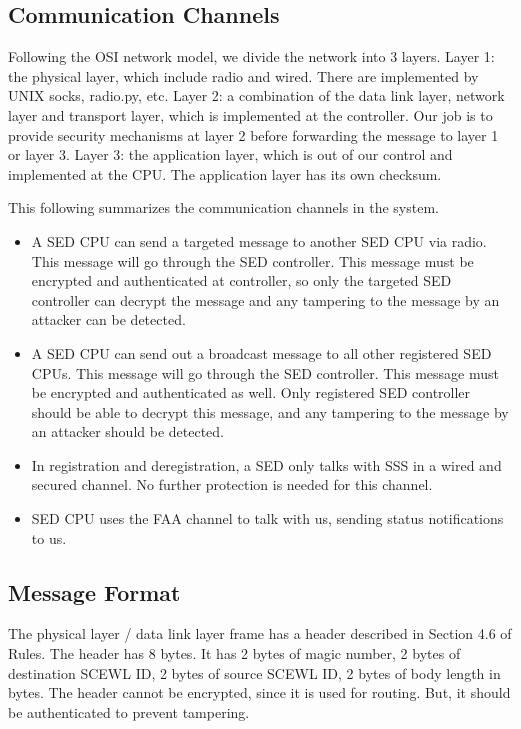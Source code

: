\documentclass[11pt,oneside,onecolumn,letterpaper]{article}
\begin{document}
\subsection{Communication Channels}

Following the OSI network model, we divide the network into 3 layers. 
Layer 1: the physical layer, which include radio and wired. There are implemented by UNIX socks, radio.py, etc.
Layer 2: a combination of the data link layer, network layer and transport layer, which is implemented at the controller. 
Our job is to provide security mechanisms at layer 2 before forwarding the message to layer 1 or layer 3.
Layer 3: the application layer, which is out of our control and implemented at the CPU. The application layer has its own checksum.

This following summarizes the communication channels in the system.

\begin{itemize}
	\item A SED CPU can send a targeted message to another SED CPU via radio. This message will go through the SED controller. This message must be encrypted and authenticated at controller, so only the targeted SED controller can decrypt the message and any tampering to the message by an attacker can be detected. 
	
	\item A SED CPU can send out a broadcast message to all other registered SED CPUs. This message will go through the SED controller. This message must be encrypted and authenticated as well. Only registered SED controller should be able to decrypt this message, and any tampering to the message by an attacker should be detected. 
	
	\item In registration and deregistration, a SED only talks with SSS in a wired and secured channel. No further protection is needed for this channel.
	
	\item SED CPU uses the FAA channel to talk with us, sending status notifications to us.
\end{itemize}

\subsection{Message Format}

The physical layer / data link layer frame has a header described in Section 4.6 of Rules.
The header has 8 bytes.
It has 2 bytes of magic number, 2 bytes of destination SCEWL ID, 2 bytes of source SCEWL ID, 2 bytes of body length in bytes.
The header cannot be encrypted, since it is used for routing.
But, it should be authenticated to prevent tampering.
\end{document}
